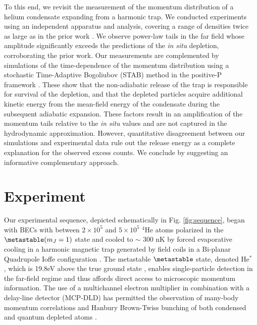 To this end, we revisit the measurement of the momentum distribution of a helium condensate expanding from a harmonic trap. We conducted experiments using an independent apparatus and analysis, covering a range of densities twice as large as in the prior work \cite{chang16}. We observe power-law tails in the far field whose amplitude significantly exceeds the predictions of the \emph{in situ} depletion, corroborating the prior work. Our measurements are complemented by simulations of the time-dependence of the momentum distribution using a stochastic Time-Adaptive Bogoliubov (STAB) method in the positive-P framework \cite{Deuar11,Kheruntsyan12,SOM}. These show that the non-adiabatic release of the trap is responsible for survival of the depletion, and that the depleted particles acquire additional kinetic energy from the mean-field energy of the condensate during the subsequent adiabatic expansion. These factors result in an amplification of the momentum tails relative to the \emph{in situ} values and are not captured in the hydrodynamic approximation. However, quantitative disagreement between our simulations and experimental data rule out the release energy as a complete explanation for the observed excess counts. We conclude by suggesting an informative complementary approach. 

\section{Experiment} Our experimental sequence, depicted schematically in Fig. \ref{fig:sequence}, began with BECs with between $2\times 10^5$ and $5\times 10^5$ $^4$He atoms polarized in the $\metastable(m_J=1)$ state and cooled to $\sim$ 300 nK by forced evaporative cooling in a harmonic magnetic trap generated by field coils in a Bi-planar Quadrupole Ioffe configuration \cite{Dall07}. The metastable $\metastable$ state, denoted He$^*$, which is 19.8eV above the true ground state \cite{Hodgman09}, enables single-particle detection in the far-field regime and thus affords direct access to microscopic momentum information. The use of a multichannel electron multiplier in combination with a delay-line detector (MCP-DLD)  \cite{Manning10} has permitted the observation of many-body momentum correlations \cite{Hodgman11,Dall13} and Hanbury Brown-Twiss bunching of both condensed \cite{Schellekens05,Jeltes07,Manning10,Dall11} and quantum depleted atoms \cite{cayla20}.

